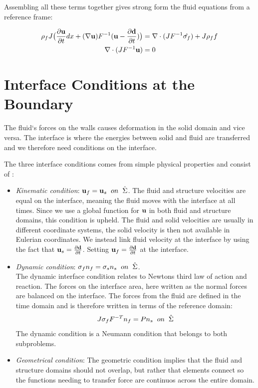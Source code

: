 Assembling all these terms together gives strong form the fluid equations from a reference frame:

\begin{align}
\label{eq:NS_mapped}
\rho_f J \big( \frac{\partial \bold{u}}{\partial t} dx + (\nabla \bold{u})F^{-1}(\bold{u}-\frac{\partial \bold{d}}{\partial t}) \big) &= \nabla \cdot( J F^{-1} \hat{\sigma_f} ) + J \rho_f f \\
\nabla \cdot (J F^{-1} \bold{u} ) &= 0
\end{align} 

\section{Interface Conditions at the Boundary}
The fluid`s forces on the walls causes deformation in the solid domain and vice versa. The interface is where the energies between solid and fluid are transferred and we therefore need conditions on the interface. \newline

The three interface conditions comes from simple physical properties and consist of \cite{Richter2010}:
\begin{itemize}
\item \textit{Kinematic condition}: $\bold{u}_f = \bold{u}_s  \hspace{2mm} on \hspace{2mm} \hat{\Sigma}$. The fluid and structure velocities are equal on the interface, meaning the fluid moves with the interface at all times. 
Since we use a global function for $\bold{u}$ in both fluid and structure domains, this condition is upheld.
The fluid and solid velocities are usually in different coordinate systems, the solid velocity is then not available in Eulerian coordinates. We instead link fluid velocity at the interface by using the fact that $\bold{u}_s = \frac{\partial \bold{d}}{\partial t}$. Setting $\bold{u}_f = \frac{\partial \bold{d}}{\partial t}$ at the interface.

\item \textit{Dynamic condition}: $  \sigma_f n_f = \sigma_s n_s \hspace{2mm} on  \hspace{2mm}\hat{\Sigma}   $. \\
	The dynamic interface condition relates to Newtons third law of action and reaction. The forces on the interface area, here written as the normal forces are balanced on the interface. The forces from the fluid are defined in the time domain and is therefore written in terms of the reference domain: 
	$$J\sigma_f F^{-T} n_f = P n_s \hspace{2mm} on  \hspace{2mm}\hat{\Sigma} $$
	The dynamic condition is a Neumann condition that belongs to both subproblems.
	
\item \textit{Geometrical condition}: The geometric condition implies that the fluid and structure domains should not overlap, but rather that elements connect so the functions needing to transfer force are continuos across the entire domain.
\end{itemize}

